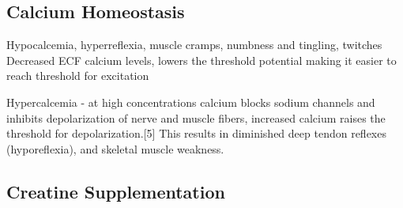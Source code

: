 \subsection{Calcium Homeostasis}
Hypocalcemia, hyperreflexia, muscle cramps, numbness and tingling, twitches
Decreased ECF calcium levels, lowers the threshold potential making it easier to reach threshold for excitation

Hypercalcemia - at high concentrations calcium blocks sodium channels and inhibits depolarization of nerve and muscle fibers, increased calcium raises the threshold for depolarization.[5] This results in diminished deep tendon reflexes (hyporeflexia), and skeletal muscle weakness.

\subsection{Creatine Supplementation}

\printbibliography[heading=subbibintoc]